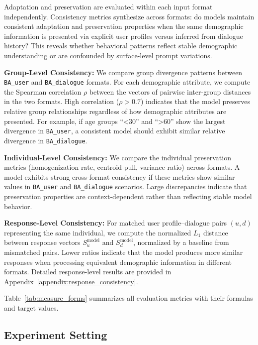 \documentclass[11pt,a4paper]{article}
\newcommand{\paratitle}[1]{\smallskip\noindent\textbf{#1}}
\begin{document}
Adaptation and preservation are evaluated within each input format independently. Consistency metrics synthesize across formats: do models maintain consistent adaptation and preservation properties when the same demographic information is presented via explicit user profiles versus inferred from dialogue history? This reveals whether behavioral patterns reflect stable demographic understanding or are confounded by surface-level prompt variations.

\paratitle{Group-Level Consistency:}
We compare group divergence patterns between \texttt{BA\_user} and \texttt{BA\_dialogue} formats. For each demographic attribute, we compute the Spearman correlation $\rho$ between the vectors of pairwise inter-group distances in the two formats. High correlation ($\rho > 0.7$) indicates that the model preserves relative group relationships regardless of how demographic attributes are presented. For example, if age groups ``<30'' and ``>60'' show the largest divergence in \texttt{BA\_user}, a consistent model should exhibit similar relative divergence in \texttt{BA\_dialogue}.

\paratitle{Individual-Level Consistency:}
We compare the individual preservation metrics (homogenization rate, centroid pull, variance ratio) across formats. A model exhibits strong cross-format consistency if these metrics show similar values in \texttt{BA\_user} and \texttt{BA\_dialogue} scenarios. Large discrepancies indicate that preservation properties are context-dependent rather than reflecting stable model behavior.

\paratitle{Response-Level Consistency:}
For matched user profile--dialogue pairs $(u, d)$ representing the same individual, we compute the normalized $L_1$ distance between response vectors $S_u^{\text{model}}$ and $S_d^{\text{model}}$, normalized by a baseline from mismatched pairs. Lower ratios indicate that the model produces more similar responses when processing equivalent demographic information in different formats. Detailed response-level results are provided in Appendix~\ref{appendix:response_consistency}.

Table~\ref{tab:measure_forms} summarizes all evaluation metrics with their formulas and target values.

\subsection{Experiment Setting}
\end{document}
